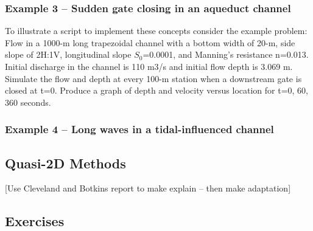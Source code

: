\subsubsection{Example 3 -- Sudden gate closing in an aqueduct channel}
To illustrate a script to implement these concepts consider the example problem:\\
Flow in a 1000-m long trapezoidal channel with a bottom width of 20-m, side slope of 2H:1V, longitudinal slope $S_0$=0.0001, and Manning's resistance n=0.013. 
Initial discharge in the channel is 110 m3/s and initial flow depth is 3.069 m.
Simulate the flow and depth at every 100-m station when a downstream gate is closed at t=0. 
Produce a graph of depth and velocity versus location for t=0, 60, 360 seconds.

\subsubsection{Example 4 -- Long waves in a tidal-influenced channel}

\subsection{Quasi-2D Methods}
[Use Cleveland and Botkins report to make explain -- then make adaptation]
\subsection{Exercises}
